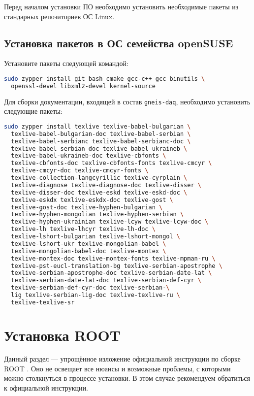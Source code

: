 \documentclass[12pt, a4paper, oneside, onecolumn]{book}
\newcommand{\GD}{{\tt gneis-daq}}
\newcommand{\ROOT}{\mbox{ROOT}}
\begin{document}
Перед началом установки ПО необходимо установить необходимые пакеты из стандарных репозиториев ОС Linux.

\subsection{Установка пакетов в ОС семейства openSUSE}

Установите пакеты следующей командой:

\begin{lstlisting}[language=bash]
sudo zypper install git bash cmake gcc-c++ gcc binutils \
  openssl-devel libxml2-devel kernel-source
\end{lstlisting}

Для сборки документации, входящей в состав \GD{}, необходимо установить следующие пакеты:

\begin{lstlisting}[language=bash]
sudo zypper install texlive texlive-babel-bulgarian \
  texlive-babel-bulgarian-doc texlive-babel-serbian \
  texlive-babel-serbianc texlive-babel-serbianc-doc \
  texlive-babel-serbian-doc texlive-babel-ukraineb \
  texlive-babel-ukraineb-doc texlive-cbfonts \
  texlive-cbfonts-doc texlive-cbfonts-fonts texlive-cmcyr \
  texlive-cmcyr-doc texlive-cmcyr-fonts \
  texlive-collection-langcyrillic texlive-cyrplain \
  texlive-diagnose texlive-diagnose-doc texlive-disser \
  texlive-disser-doc texlive-eskd texlive-eskd-doc \
  texlive-eskdx texlive-eskdx-doc texlive-gost \
  texlive-gost-doc texlive-hyphen-bulgarian \
  texlive-hyphen-mongolian texlive-hyphen-serbian \
  texlive-hyphen-ukrainian texlive-lcyw texlive-lcyw-doc \
  texlive-lh texlive-lhcyr texlive-lh-doc \
  texlive-lshort-bulgarian texlive-lshort-mongol \
  texlive-lshort-ukr texlive-mongolian-babel \
  texlive-mongolian-babel-doc texlive-montex \
  texlive-montex-doc texlive-montex-fonts texlive-mpman-ru \
  texlive-pst-eucl-translation-bg texlive-serbian-apostrophe \
  texlive-serbian-apostrophe-doc texlive-serbian-date-lat \
  texlive-serbian-date-lat-doc texlive-serbian-def-cyr \
  texlive-serbian-def-cyr-doc texlive-serbian-\
  lig texlive-serbian-lig-doc texlive-texlive-ru \
  texlive-texlive-sr
\end{lstlisting}

\section{Установка \ROOT{}}

Данный раздел --- упрощённое изложение официальной инструкции по сборке \ROOT{} \cite{RootBuild}. Оно не освещает все нюансы и возможные проблемы, с которыми можно столкнуться в процессе установки. В этом случае рекомендуем обратиться к официальной инструкции.
\end{document}
